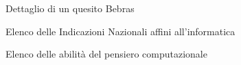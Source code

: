 \documentclass[12pt]{report}
\begin{document}
\begin{figure}[H]
	\centering
	\caption{Dettaglio di un quesito Bebras}
	\label{App_dettaglioQuesito}
\end{figure}


\begin{figure}[H]
	\centering
	 \label{indicazioniNazionali}
	\caption{Elenco delle Indicazioni Nazionali affini all'informatica}
\end{figure}


\begin{figure}[H]
	\centering
	\caption{Elenco delle abilità del pensiero computazionale}
	\label{App_CT}
\end{figure}
\end{document}

